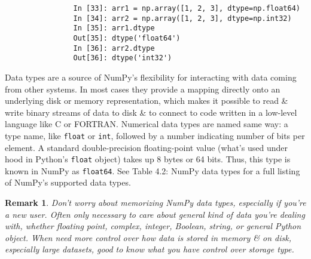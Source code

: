 \documentclass{article}
\newtheorem{remark}{Remark}
\begin{document}
\begin{itemize}
\begin{itemize}
\begin{itemize}
			\begin{verbatim}
				In [33]: arr1 = np.array([1, 2, 3], dtype=np.float64)
				In [34]: arr2 = np.array([1, 2, 3], dtype=np.int32)
				In [35]: arr1.dtype
				Out[35]: dtype('float64')
				In [36]: arr2.dtype
				Out[36]: dtype('int32')
			\end{verbatim}
			Data types are a source of NumPy's flexibility for interacting with data coming from other systems. In most cases they provide a mapping directly onto an underlying disk or memory representation, which makes it possible to read \& write binary streams of data to disk \&  to connect to code written in a low-level language like C or FORTRAN. Numerical data types are named same way: a type name, like {\tt float} or {\tt int}, followed by a number indicating number of bits per element. A standard double-precision floating-point value (what's used under hood in Python's {\tt float} object) takes up 8 bytes or 64 bits. Thus, this type is known in NumPy as {\tt float64}. See {\sf Table 4.2: NumPy data types} for a full listing of NumPy's supported data types.
			\begin{remark}
				Don't worry about memorizing NumPy data types, especially if you're a new user. Often only necessary to care about general \emph{kind} of data you're dealing with, whether floating point, complex, integer, Boolean, string, or general Python object. When need more control over how data is stored in memory \& on disk, especially large datasets, good to know what you have control over storage type.
			\end{remark}
			

\end{itemize}
\end{itemize}
\end{itemize}
\end{document}
